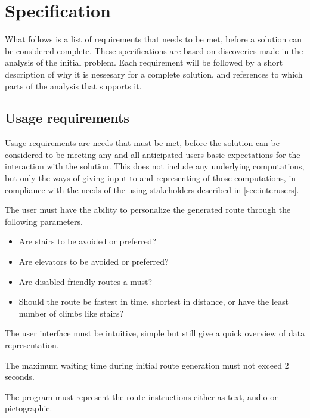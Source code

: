 \section{Specification} %
\label{sec:specification}

What follows is a list of requirements that needs to be met, before a solution can be considered complete. These specifications are based on discoveries made in the analysis of the initial problem. Each requirement will be followed by a short description of why it is nessesary for a complete solution, and references to which parts of the analysis that supports it.

\subsection{Usage requirements}

Usage requirements are needs that must be met, before the solution can be considered to be meeting any and all anticipated users basic expectations for the interaction with the solution. This does not include any underlying computations, but only the ways of giving input to and representing of those computations, in compliance with the needs of the using stakeholders described in \cref{sec:interusers}.

\begin{description}
	\item[Hygge hejsa, simon har briller] The user must have the ability to personalize the generated route through the following parameters.

			\begin{itemize}
				\item Are stairs to be avoided or preferred?
				\item Are elevators to be avoided or preferred?
				\item Are disabled-friendly routes a must?
				\item Should the route be fastest in time, shortest in distance, or have the least number of climbs like stairs?
			\end{itemize}

	\item The user interface must be intuitive, simple but still give a quick overview of data representation.
	\item The maximum waiting time during initial route generation must not exceed 2 seconds.
	\item The program must represent the route instructions either as text, audio or pictographic.
\end{description}


